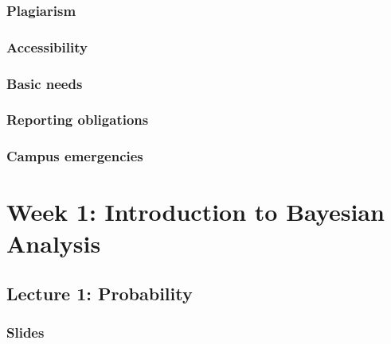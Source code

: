 \documentclass[
]{book}
\begin{document}
\subsection{Plagiarism}\label{plagiarism}

\subsection{Accessibility}\label{accessibility}

\subsection{Basic needs}\label{basic-needs}

\subsection{Reporting obligations}\label{reporting-obligations}

\subsection{Campus emergencies}\label{campus-emergencies}

\chapter{Week 1: Introduction to Bayesian Analysis}\label{week-1-introduction-to-bayesian-analysis}

\section{Lecture 1: Probability}\label{lecture-1-probability}

\subsection{Slides}\label{slides}


\end{document}
